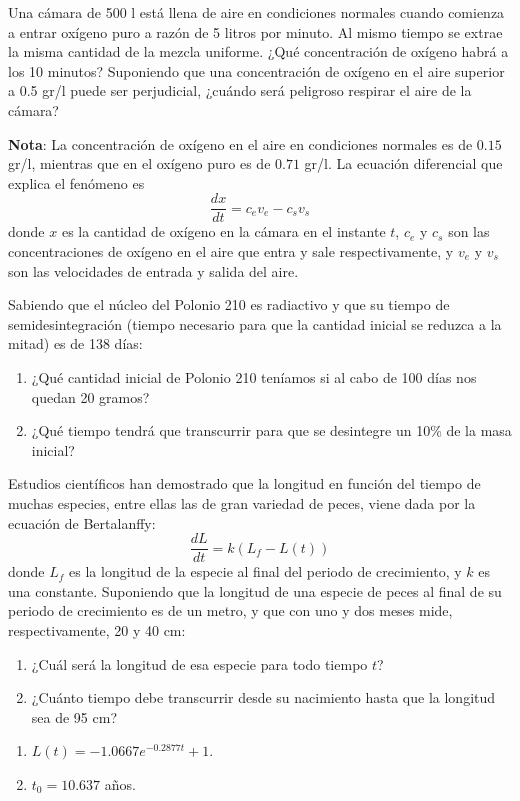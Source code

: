 {Una cámara de 500 l está llena de aire en condiciones normales
cuando comienza a entrar oxí­geno puro a razón de 5 litros por minuto. 
Al mismo tiempo se extrae la misma cantidad de la mezcla uniforme. ¿Qué
concentración de oxí­geno habrá a los 10 minutos? Suponiendo que una
concentración de oxí­geno en el aire superior a 0.5 gr/l puede ser perjudicial,
¿cuándo será peligroso respirar el aire de la cámara? 

\textbf{Nota}: La concentración de oxí­geno en el aire en condiciones normales es
de $0.15$ gr/l, mientras que en el oxí­geno puro es de $0.71$ gr/l. La ecuación
diferencial que explica el fenómeno es
\[
\frac{dx}{dt}=c_ev_e-c_sv_s
\]
donde $x$ es la cantidad de oxí­geno en la cámara en el instante $t$, $c_e$ y
$c_s$ son las concentraciones de oxí­geno en el aire que entra y sale
respectivamente, y $v_e$ y $v_s$ son las velocidades de entrada y salida del
aire. 
}
{
}
{}



{Sabiendo que el núcleo del Polonio 210 es radiactivo y que su tiempo de semidesintegración (tiempo necesario para que
la cantidad inicial se reduzca a la mitad) es de 138 días:
\begin{enumerate}
\item ¿Qué cantidad inicial de Polonio 210 teníamos si al cabo de 100 días nos quedan 20 gramos?

\item ¿Qué tiempo tendrá que transcurrir para que se desintegre un 10\% de la masa inicial?
\end{enumerate}
}
{
}
{}


{Estudios científicos han demostrado que la longitud en función
del tiempo de muchas especies, entre ellas las de gran variedad de
peces, viene dada por la ecuación de Bertalanffy:
\[
\frac{{dL}}{{dt}} = k\left( {L_f  - L(t)} \right)
\]
donde $L_f$ es la longitud de la especie al final del periodo de
crecimiento, y $k$ es una constante. Suponiendo que la longitud de
una especie de peces al final de su periodo de crecimiento es de un
metro, y que con uno y dos meses mide, respectivamente, 20 y 40 cm:
\begin{enumerate}
\item ¿Cuál será la longitud de esa especie para todo tiempo $t$?
\item ¿Cuánto tiempo debe transcurrir desde su nacimiento hasta que la longitud sea de 95 cm?
\end{enumerate}
}
{\begin{enumerate}
\item $L(t)=-1.0667e^{-0.2877t}+1$.
\item $t_0=10.637$ años. 
\end{enumerate}
}
{}


